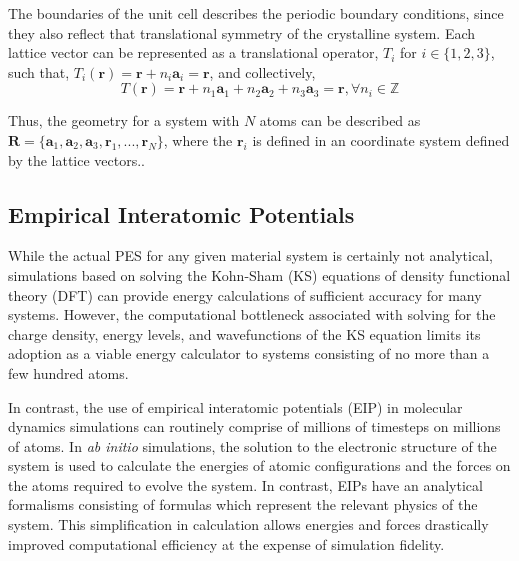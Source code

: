 The boundaries of the unit cell describes the periodic boundary conditions, since they also reflect that translational symmetry of the crystalline system.
Each lattice vector can be represented as a translational operator, $T_i$ for ${i\in\{1,2,3\}}$, such that, $T_i(\bm{r})=\bm{r} + n_i \bm{a}_i = \bm{r}$, and collectively,
\begin{equation}
    T(\bm{r}) = \bm{r}
		    + n_1 \bm{a}_1
		    + n_2 \bm{a}_2
		    + n_3 \bm{a}_3 = \bm{r}, \forall n_i \in \mathbb{Z}
\end{equation}

Thus, the geometry for a system with $N$ atoms can be described as
	$\bm{R} = \{\bm{a}_1,\bm{a}_2,\bm{a}_3,\bm{r}_1,...,\bm{r}_N\}$,
	where the $\bm{r}_i$ is defined in an coordinate system defined by the lattice vectors..

\subsection{Empirical Interatomic Potentials}

While the actual PES for any given material system is certainly not analytical, simulations based on solving the Kohn-Sham (KS) equations\cite{kohn1965_dft} of density functional theory (DFT)\cite{hohenberg1964_dft} can provide energy calculations of sufficient accuracy for many systems.  However, the computational bottleneck associated with solving for the charge density, energy levels, and wavefunctions of the KS equation limits its adoption as a viable energy calculator to systems consisting of no more than a few hundred atoms.

In contrast, the use of empirical interatomic potentials (EIP) in molecular dynamics simulations can routinely comprise of millions of timesteps on millions of atoms.  In \emph{ab initio} simulations, the solution to the electronic structure of the system is used to calculate the energies of atomic configurations and the forces on the atoms required to evolve the system. In contrast, EIPs have an analytical formalisms consisting of formulas which represent the relevant physics of the system.  This simplification in calculation allows energies and forces drastically improved computational efficiency at the expense of simulation fidelity.

